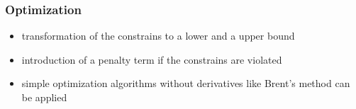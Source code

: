  \subsubsection{Optimization}
 
 \begin{itemize}
 	\item transformation of the constrains to a lower and a upper bound
 	\item introduction of a penalty term if the constrains are violated
 	\item simple optimization algorithms without derivatives like Brent's method can be applied   
 \end{itemize}